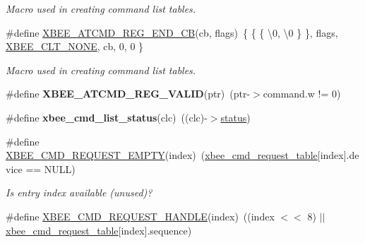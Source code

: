 \begin{DoxyCompactItemize}
\begin{DoxyCompactList}\small\item\em Macro used in creating command list tables. \end{DoxyCompactList}\item 
\#define \hyperlink{group__xbee__atcmd_gae8d6778e286e3bf82eafc842d451c161}{X\+B\+E\+E\+\_\+\+A\+T\+C\+M\+D\+\_\+\+R\+E\+G\+\_\+\+E\+N\+D\+\_\+\+CB}(cb,  flags)~\{ \{ \{ \textquotesingle{}\textbackslash{}0\textquotesingle{}, \textquotesingle{}\textbackslash{}0\textquotesingle{} \} \}, flags, \hyperlink{group__xbee__atcmd_gga1bd8ecd38c107579d20ded3c79a7d70ba01bd43706bd844415cc0882b861df4d1}{X\+B\+E\+E\+\_\+\+C\+L\+T\+\_\+\+N\+O\+NE}, cb, 0, 0 \}
\begin{DoxyCompactList}\small\item\em Macro used in creating command list tables. \end{DoxyCompactList}\item 
\mbox{\label{group__xbee__atcmd_ga1c37bac63df4c1378f8140c6e02eb301}} 
\#define {\bfseries X\+B\+E\+E\+\_\+\+A\+T\+C\+M\+D\+\_\+\+R\+E\+G\+\_\+\+V\+A\+L\+ID}(ptr)~(ptr-\/$>$command.\+w != 0)
\item 
\mbox{\label{group__xbee__atcmd_ga75cfdd39f5f70bd8a180f9c858927aec}} 
\#define {\bfseries xbee\+\_\+cmd\+\_\+list\+\_\+status}(clc)~((clc)-\/$>$\hyperlink{group__xbee__atcmd_gade818037fd6c985038ff29656089758d}{status})
\item 
\mbox{\label{group__xbee__atcmd_ga56c0812894871f4a6429ef00ac2d15c7}} 
\#define \hyperlink{group__xbee__atcmd_ga56c0812894871f4a6429ef00ac2d15c7}{X\+B\+E\+E\+\_\+\+C\+M\+D\+\_\+\+R\+E\+Q\+U\+E\+S\+T\+\_\+\+E\+M\+P\+TY}(index)~(\hyperlink{group__xbee__atcmd_ga551531248de3d539dfb15bd89cf4734b}{xbee\+\_\+cmd\+\_\+request\+\_\+table}\mbox{[}index\mbox{]}.device == N\+U\+LL)
\begin{DoxyCompactList}\small\item\em Is entry {\itshape index} available (unused)? \end{DoxyCompactList}\item 
\#define \hyperlink{group__xbee__atcmd_gac86e9f2dc459c0c6b758ba90142bbc54}{X\+B\+E\+E\+\_\+\+C\+M\+D\+\_\+\+R\+E\+Q\+U\+E\+S\+T\+\_\+\+H\+A\+N\+D\+LE}(index)~((index $<$$<$ 8) $\vert$$\vert$ \hyperlink{group__xbee__atcmd_ga551531248de3d539dfb15bd89cf4734b}{xbee\+\_\+cmd\+\_\+request\+\_\+table}\mbox{[}index\mbox{]}.sequence)

\end{DoxyCompactItemize}
